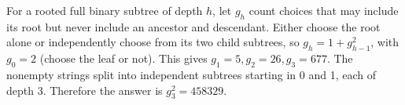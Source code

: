 For a rooted full binary subtree of depth $h$, let $g_h$ count choices that may include its root but never include an ancestor and descendant. Either choose the root alone or independently choose from its two child subtrees, so $g_h=1+g_{h-1}^2$, with $g_0=2$ (choose the leaf or not). This gives $g_1=5,g_2=26,g_3=677$. The nonempty strings split into independent subtrees starting in 0 and 1, each of depth 3. Therefore the answer is $g_3^2=\boxed{458329}$.
